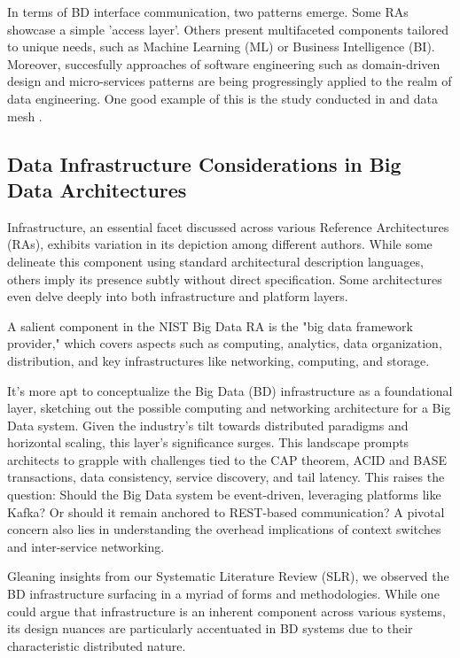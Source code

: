 \documentclass[conference]{IEEEtran}
\begin{document}
In terms of BD interface communication, two patterns emerge. Some RAs showcase a simple 'access layer'. Others present multifaceted components tailored to unique needs, such as Machine Learning (ML) or Business Intelligence (BI). Moreover, succesfully approaches of software engineering such as domain-driven design and micro-services patterns are being progressingly applied to the realm of data engineering. One good example of this is the study conducted in \cite{b4} and data mesh \cite{b5}.

\subsection{Data Infrastructure Considerations in Big Data Architectures}

Infrastructure, an essential facet discussed across various Reference Architectures (RAs), exhibits variation in its depiction among different authors. While some delineate this component using standard architectural description languages, others imply its presence subtly without direct specification. Some architectures even delve deeply into both infrastructure and platform layers.

A salient component in the NIST Big Data RA is the "big data framework provider," which covers aspects such as computing, analytics, data organization, distribution, and key infrastructures like networking, computing, and storage.

It's more apt to conceptualize the Big Data (BD) infrastructure as a foundational layer, sketching out the possible computing and networking architecture for a Big Data system. Given the industry's tilt towards distributed paradigms and horizontal scaling, this layer's significance surges. This landscape prompts architects to grapple with challenges tied to the CAP theorem, ACID and BASE transactions, data consistency, service discovery, and tail latency. This raises the question: Should the Big Data system be event-driven, leveraging platforms like Kafka? Or should it remain anchored to REST-based communication? A pivotal concern also lies in understanding the overhead implications of context switches and inter-service networking.

Gleaning insights from our Systematic Literature Review (SLR), we observed the BD infrastructure surfacing in a myriad of forms and methodologies. While one could argue that infrastructure is an inherent component across various systems, its design nuances are particularly accentuated in BD systems due to their characteristic distributed nature.
\end{document}
